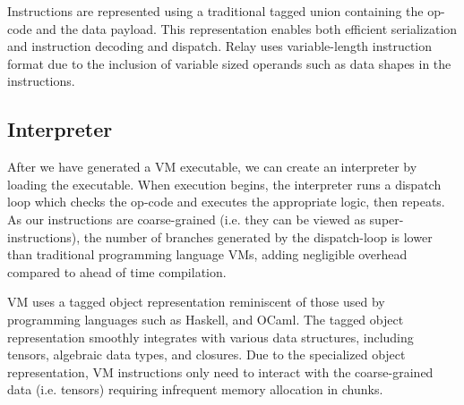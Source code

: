 Instructions are represented using a traditional tagged union containing the op-code and the data payload. This representation enables both efficient serialization and instruction decoding and dispatch. Relay uses variable-length instruction format due to the inclusion of variable sized operands such as data shapes in the instructions.

\subsection{Interpreter}

After we have generated a VM executable,
we can create an interpreter by loading the executable. When execution begins, the interpreter runs a dispatch loop which checks the op-code and executes the appropriate logic, then repeats. As our instructions are coarse-grained (i.e. they can be viewed as super-instructions), the number of branches generated by the dispatch-loop is lower than traditional programming language VMs, adding negligible overhead compared to ahead of time compilation.

VM uses a tagged object representation reminiscent of those used by programming languages such as Haskell, and OCaml. The tagged object representation smoothly integrates with various data structures, including tensors, algebraic data types, and closures. Due to the specialized object representation, VM instructions only need to interact with the coarse-grained data (i.e. tensors) requiring infrequent memory allocation in chunks.

